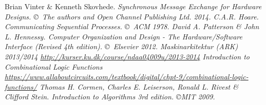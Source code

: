 \begin{thebibliography}{9}
     Brian Vinter \& Kenneth Skovhede. \it{Synchronous Message
        Exchange for Hardware Designs}. \copyright\ The authors and Open
        Channel Publishing Ltd. 2014.
     C.A.R. Hoare. \it{Communicating Sequential Processes}.
        \copyright\ ACM 1978.
     David A. Patterson \& John L. Hennessy. \it{Computer
        Organization and Design - The Hardware/Software Interface (Revised 4th
        edition)}.  \copyright\ Elsevier 2012.
     \it{Maskinarkitektur (ARK) 2013/2014}
        \url{http://kurser.ku.dk/course/ndaa04009u/2013-2014}
     Introduction to Combinational Logic Functions
        \url{https://www.allaboutcircuits.com/textbook/digital/chpt-9/combinational-logic-functions/}
     Thomas H. Cormen, Charles E. Leiserson, Ronald L. Rivest
        \& Clifford Stein. \it{Introduction to Algorithms 3rd edition}.
        \copyright MIT 2009.
\end{thebibliography}

